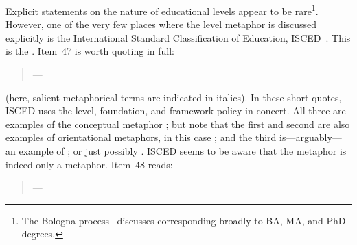 Explicit statements on the nature of educational levels appear to be
rare\footnote{The Bologna process~\parencite{keeling2006} discusses
   corresponding broadly to BA, MA, and PhD degrees.}.
However, one of the very few places where the level metaphor is
discussed explicitly is the International Standard Classification of
Education,
ISCED~\parencite{unesco_institute_for_statistics_international_2012}.
This is the .  Item~47 is worth
quoting in full:

\begin{singlespace}
\begin{quote}
---\parencite[item
  47]{unesco_institute_for_statistics_international_2012}
\end{quote}
\end{singlespace}

\noindent
(here, salient metaphorical terms are indicated in italics).  In these
short quotes, ISCED uses the level, foundation, and framework policy
in concert.  All three are examples of the conceptual metaphor
; but note that the first and second are
also examples of orientational metaphors, in this case ; and the third is---arguably---an example of ; or just possibly .
ISCED seems to be aware that the  metaphor is indeed
only a metaphor.  Item~48 reads:

\begin{singlespace}
\begin{quote}
  ---\parencite[item
    47]{unesco_institute_for_statistics_international_2012}
\end{quote}
\end{singlespace}

